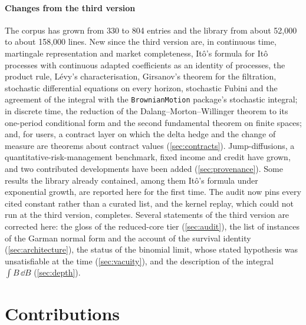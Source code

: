 \documentclass[11pt]{article}
\begin{document}
\paragraph{Changes from the third version}
The corpus has grown from 330 to 804 entries and the library from about 52,000 to about 158,000 lines. New since
the third version are, in continuous time, martingale representation and market completeness, It\^o's formula for
It\^o processes with continuous adapted coefficients as an identity of processes, the product rule, L\'evy's
characterisation, Girsanov's theorem for the filtration, stochastic differential equations on every horizon,
stochastic Fubini and the agreement of the integral with the \texttt{BrownianMotion} package's stochastic integral;
in discrete time, the reduction of the Dalang--Morton--Willinger theorem to its one-period conditional form and the
second fundamental theorem on finite spaces; and, for users, a contract layer on which the delta hedge and the change
of measure are theorems about contract values (\cref{sec:contracts}). Jump-diffusions, a quantitative-risk-management
benchmark, fixed income and credit have grown, and two contributed developments have been added
(\cref{sec:provenance}). Some results the library already contained, among them It\^o's formula under exponential
growth, are reported here for the first time. The audit now pins every cited constant rather than a curated list,
and the kernel replay, which could not run at the third version, completes. Several statements of the third version
are corrected here: the gloss of the reduced-core tier (\cref{sec:audit}), the list of instances of the Garman normal
form and the account of the survival identity (\cref{sec:architecture}), the status of the binomial limit, whose
stated hypothesis was unsatisfiable at the time (\cref{sec:vacuity}), and the description of the integral
$\int B\,\dd B$ (\cref{sec:depth}).

\section{Contributions}\label{sec:contributions}
\end{document}
